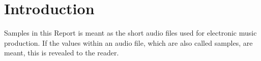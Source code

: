 \section{Introduction}
\label{sec:Introduction}

Samples in this Report is meant as the short audio files used for electronic music production. If the values within an audio file, which are also called samples, are meant, this is revealed to the reader. %